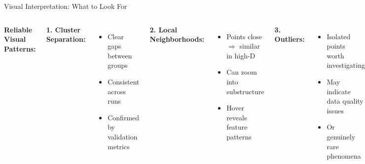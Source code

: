\documentclass[aspectratio=169]{beamer}
\begin{document}
\begin{frame}{Visual Interpretation: What to Look For}
\begin{columns}
\textbf{Reliable Visual Patterns:}

\textbf{1. Cluster Separation:}
\begin{itemize}
\item Clear gaps between groups
\item Consistent across runs
\item Confirmed by validation metrics
\end{itemize}

\textbf{2. Local Neighborhoods:}
\begin{itemize}
\item Points close $\Rightarrow$ similar in high-D
\item Can zoom into substructure
\item Hover reveals feature patterns
\end{itemize}

\textbf{3. Outliers:}
\begin{itemize}
\item Isolated points worth investigating
\item May indicate data quality issues
\item Or genuinely rare phenomena
\end{itemize}

\textbf{4. Density Variations:}
\begin{itemize}
\item Tight vs loose clusters
\item Reflects high-D density
\item Adjust perplexity to explore
\end{itemize}

\textbf{Unreliable Visual Patterns:}

\end{columns}
\end{frame}
\end{document}
